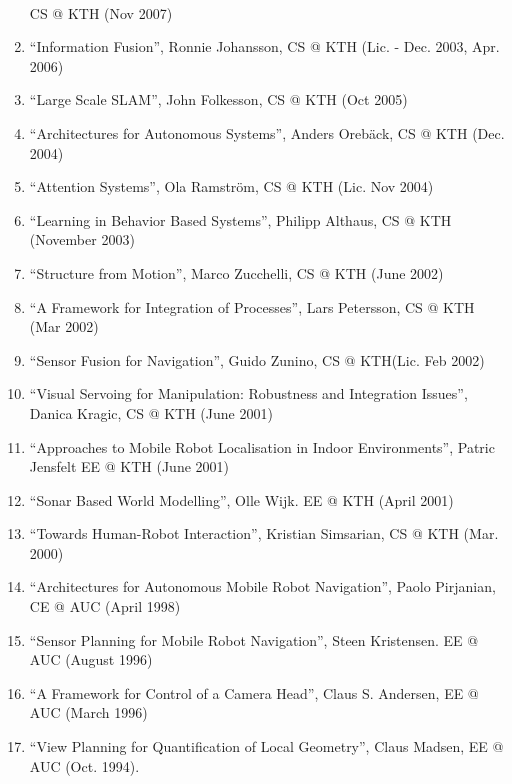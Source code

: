 \documentclass{article}
\begin{document}
\begin{cv}
\begin{cvlist}{~}
\begin{enumerate}
    CS @ KTH (Nov 2007)
  \item ``Information Fusion'', Ronnie Johansson, CS @ KTH (Lic. -
    Dec. 2003, Apr. 2006)
  \item ``Large Scale SLAM'', John Folkesson, CS @ KTH (Oct 2005)
  \item ``Architectures for Autonomous Systems'', Anders Oreb{\"a}ck,
    CS @ KTH (Dec. 2004)
  \item ``Attention Systems'', Ola Ramstr\"om, CS @ KTH (Lic. Nov 2004)
  \item ``Learning in Behavior Based Systems'', Philipp Althaus, CS @
    KTH (November 2003)
  \item ``Structure from Motion'', Marco Zucchelli, CS @ KTH (June 2002)
  \item ``A Framework for Integration of Processes'', Lars Petersson,
    CS @ KTH (Mar 2002)
  \item ``Sensor Fusion for Navigation'', Guido Zunino, CS @
    KTH(Lic. Feb 2002)
  \item ``Visual Servoing for Manipulation: Robustness and Integration
    Issues'', Danica Kragic, CS @ KTH (June 2001)
  \item ``Approaches to Mobile Robot Localisation in Indoor
    Environments'', Patric Jensfelt EE @ KTH (June 2001)
  \item ``Sonar Based World Modelling'', Olle Wijk.  EE @ KTH (April 2001)
  \item ``Towards Human-Robot Interaction'', Kristian Simsarian, CS @
    KTH (Mar. 2000)
  \item ``Architectures for Autonomous Mobile Robot Navigation'',
    Paolo Pirjanian, CE @ AUC (April 1998)
  \item ``Sensor Planning for Mobile Robot Navigation'', Steen
    Kristensen.  EE @ AUC (August 1996)
  \item ``A Framework for Control of a Camera Head'', Claus
    S. Andersen, EE @ AUC (March 1996)
  \item ``View Planning for Quantification of Local Geometry'', Claus
    Madsen, EE @ AUC (Oct. 1994).
\end{enumerate}


\end{cvlist}
\end{cv}
\end{document}
